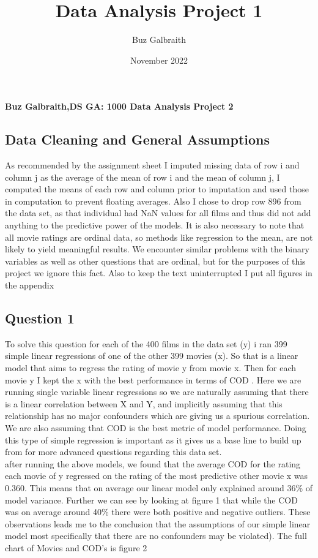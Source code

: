 \documentclass{article}
\title{Data Analysis Project 1}
\author{Buz Galbraith }
\date{November 2022}
\begin{document}
\textbf{Buz Galbraith,DS GA: 1000 Data Analysis Project 2}

\subsection*{Data Cleaning and General Assumptions}

\small{
As recommended by the assignment sheet I imputed missing data of row i and column j as the average of the mean of row i and the mean of column j, I computed the means of each row and column prior to imputation and used those in computation to prevent floating averages. Also I chose to drop row 896 from the data set, as that individual had NaN values for all films and thus did not add anything to the predictive power of the models. It is also necessary to note that all movie ratings are ordinal data, so methods like regression to the mean, are not likely to yield meaningful results. We encounter similar problems with the binary variables as well as other questions that are ordinal, but for the purposes of this project we ignore this fact. Also to keep the text uninterrupted I put all figures in the appendix

}  

\subsection*{Question 1}
To solve this question for each of the 400 films in the data set (y) i ran 399 simple linear regressions of one of the other 399 movies (x). So that is a linear model that aims to regress the rating of movie y from movie x. Then for each movie y I kept the x with the best performance in terms of COD . Here we are running single variable linear regressions so we are naturally assuming that there is a linear correlation between X and Y, and implicitly assuming that this relationship has no major confounders which are giving us a spurious correlation. We are also assuming that COD is the best metric of model performance. Doing this type of simple regression is important as it gives us a base line to build up from for more advanced questions regarding this data set. 
\\ after running the above models, we found that the average COD for the rating each movie of y regressed on the rating of the most predictive other movie x was 0.360. This means that on average our linear model only explained around 36\% of model variance. Further we can see by looking at figure 1 that while the COD was on average around 40\% there were both positive and negative outliers. These observations leads me to the conclusion that the assumptions of our simple linear model most specifically that there are no confounders may be violated). The full chart of Movies and COD's is figure 2 
\end{document}
